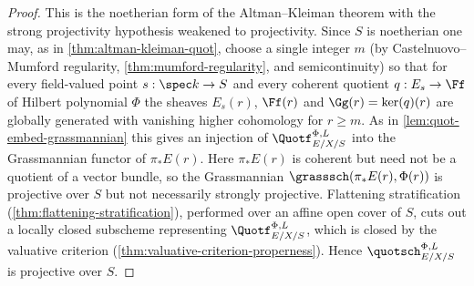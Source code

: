 \begin{proof}
  This is the noetherian form of the Altman--Kleiman theorem with the strong
  projectivity hypothesis weakened to projectivity. Since $S$ is noetherian one
  may, as in \cref{thm:altman-kleiman-quot}, choose a single integer $m$ (by
  Castelnuovo--Mumford regularity, \cref{thm:mumford-regularity}, and
  semicontinuity) so that for every field-valued point $s : \spec k \to S$ and
  every coherent quotient $q : E_s \to \Ff$ of Hilbert polynomial $\Phi$ the
  sheaves $E_s(r)$, $\Ff(r)$ and $\Gg(r) = \ker(q)(r)$ are globally generated
  with vanishing higher cohomology for $r \ge m$. As in
  \cref{lem:quot-embed-grassmannian} this gives an injection of
  $\Quotf_{E/X/S}^{\Phi,L}$ into the Grassmannian functor of $\pi_* E(r)$. Here
  $\pi_* E(r)$ is coherent but need not be a quotient of a vector bundle, so the
  Grassmannian $\grasssch(\pi_* E(r), \Phi(r))$ is projective over $S$ but not
  necessarily strongly projective. Flattening stratification
  (\cref{thm:flattening-stratification}), performed over an affine open cover of
  $S$, cuts out a locally closed subscheme representing
  $\Quotf_{E/X/S}^{\Phi,L}$, which is closed by the valuative criterion
  (\cref{thm:valuative-criterion-properness}). Hence $\quotsch_{E/X/S}^{\Phi,L}$
  is projective over $S$.
\end{proof}

